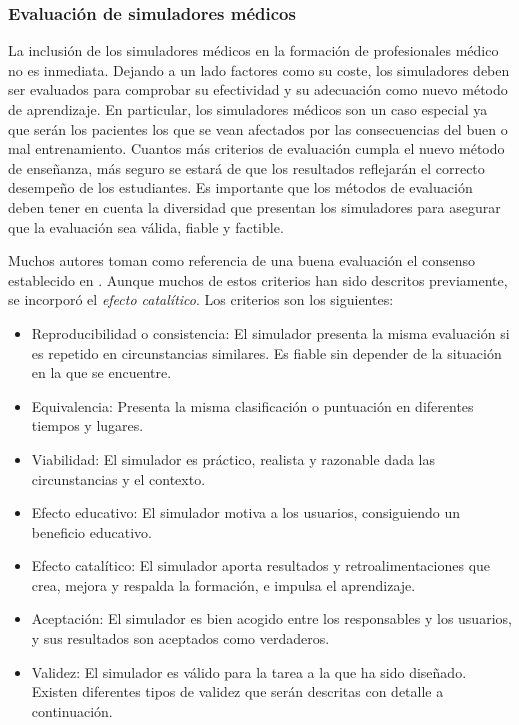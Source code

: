 



\subsubsection{Evaluación de simuladores médicos}
\label{art:evaluation}

La inclusión de los simuladores médicos en la formación de profesionales médico no es inmediata. Dejando a un lado factores como su coste, los simuladores deben ser evaluados para comprobar su efectividad y su adecuación como nuevo método de aprendizaje. En particular, los simuladores médicos son un caso especial ya que serán los pacientes los que se vean afectados por las consecuencias del buen o mal entrenamiento. Cuantos más criterios de evaluación cumpla el nuevo método de enseñanza, más seguro se estará de que los resultados reflejarán el correcto desempeño de los estudiantes.
Es importante que los métodos de evaluación deben tener en cuenta la diversidad que presentan los simuladores para asegurar que la evaluación sea válida, fiable y factible. 

Muchos autores toman como referencia de una buena evaluación el consenso establecido en  \cite{norcini2011criteria}. Aunque muchos de estos criterios han sido descritos previamente, se incorporó el  \emph{efecto catalítico}. Los criterios son los siguientes:

\begin{itemize}

\item Reproducibilidad o consistencia: El simulador presenta la misma evaluación si es repetido en circunstancias similares. Es fiable sin depender de la situación en la que se encuentre.
\item Equivalencia: Presenta la misma clasificación o puntuación en diferentes tiempos y lugares.%
\item Viabilidad: El simulador es práctico, realista y razonable dada las circunstancias y el contexto.
\item Efecto educativo: El simulador motiva a los usuarios, consiguiendo un beneficio educativo.
\item Efecto catalítico: El simulador aporta resultados y retroalimentaciones que crea, mejora y respalda la formación, e impulsa el aprendizaje.
\item Aceptación: El simulador es bien acogido entre los responsables y los usuarios, y sus resultados son aceptados como verdaderos.
\item Validez: El simulador es válido para la tarea a la que ha sido diseñado. Existen diferentes tipos de validez que serán descritas con detalle a continuación.
\end{itemize}




